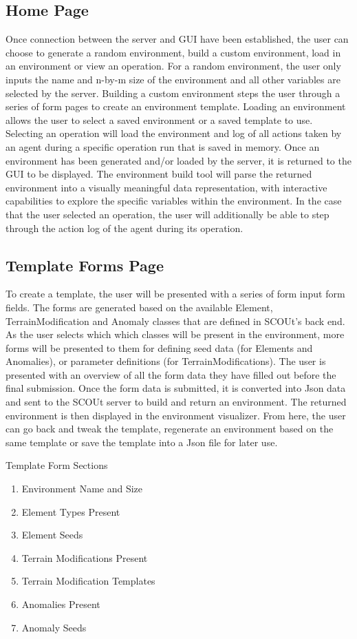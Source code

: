 \subsection{Home Page}
Once connection between the server and GUI have been established, the user can choose to generate a random environment, build a custom environment, load in an environment or view an operation.
For a random environment, the user only inputs the name and n-by-m size of the environment and all other variables are selected by the server.
Building a custom environment steps the user through a series of form pages to create an environment template.
Loading an environment allows the user to select a saved environment or a saved template to use.
Selecting an operation will load the environment and log of all actions taken by an agent during a specific operation run that is saved in memory.
Once an environment has been generated and/or loaded by the server, it is returned to the GUI to be displayed.
The environment build tool will parse the returned environment into a visually meaningful data representation, with interactive capabilities to explore the specific variables within the environment.
In the case that the user selected an operation, the user will additionally be able to step through the action log of the agent during its operation.


\subsection{Template Forms Page}
To create a template, the user will be presented with a series of form input form fields.
The forms are generated based on the available Element, TerrainModification and Anomaly classes that are defined in SCOUt's back end.
As the user selects which which classes will be present in the environment, more forms will be presented to them for defining seed data (for Elements and Anomalies), or parameter definitions (for TerrainModifications).
The user is presented with an overview of all the form data they have filled out before the final submission.
Once the form data is submitted, it is converted into Json data and sent to the SCOUt server to build and return an environment.
The returned environment is then displayed in the environment visualizer.
From here, the user can go back and tweak the template, regenerate an environment based on the same template or save the template into a Json file for later use.

Template Form Sections
\begin{enumerate}
  \item Environment Name and Size
  \item Element Types Present
  \item Element Seeds
  \item Terrain Modifications Present
  \item Terrain Modification Templates
  \item Anomalies Present
  \item Anomaly Seeds
\end{enumerate}


